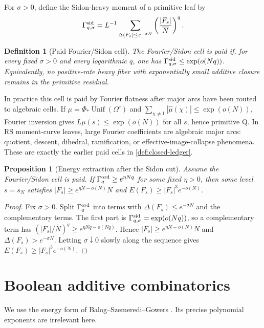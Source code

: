 \documentclass[11pt,a4paper]{amsart}
\numberwithin{equation}{section}
\newtheorem{proposition}[theorem]{Proposition}
\newtheorem{definition}[theorem]{Definition}
\theoremstyle{remark}
\newcommand{\OmegaC}{\Omega^{\circ}}
\newcommand{\Gord}{\Gamma^{\rm ord}}
\newcommand{\Gsid}{\Gamma^{\rm sid}}
\newcommand{\barN}{\overline N}
\begin{document}
For \(\sigma>0\), define the Sidon-heavy moment of a primitive leaf by
\[
        \Gsid_{q,\sigma}
        =L^{-1}\sum_{\Delta(F_s)\le e^{-\sigma N}}
        \left(\frac{|F_s|}{\barN}\right)^q .
\]

\begin{definition}[Paid Fourier/Sidon cell]\label{def:sidon-paid}
The Fourier/Sidon cell is paid if, for every fixed \(\sigma>0\) and every logarithmic \(q\), one has \(\Gsid_{q,\sigma}\le\exp(o(Nq))\).  Equivalently, no positive-rate heavy fiber with exponentially small additive closure remains in the primitive residual.
\end{definition}

In practice this cell is paid by Fourier flatness after major arcs have been routed to algebraic cells.  If \(\mu=\Phi_*\operatorname{Unif}(\OmegaC)\) and \(\sum_{\chi\ne1}|\widehat\mu(\chi)|\le\exp(o(N))\), Fourier inversion gives \(L\mu(s)\le\exp(o(N))\) for all \(s\), hence primitive Q.  In RS moment-curve leaves, large Fourier coefficients are algebraic major arcs: quotient, descent, dihedral, ramification, or effective-image-collapse phenomena.  These are exactly the earlier paid cells in \cref{def:closed-ledger}.

\begin{proposition}[Energy extraction after the Sidon cut]\label{prop:energy-extract}
Assume the Fourier/Sidon cell is paid.  If \(\Gord_q\ge e^{\eta Nq}\) for some fixed \(\eta>0\), then some level \(s=s_N\) satisfies \(|F_s|\ge e^{\eta N-o(N)}\barN\) and \(E(F_s)\ge |F_s|^3e^{-o(N)}\).
\end{proposition}

\begin{proof}
Fix \(\sigma>0\).  Split \(\Gord_q\) into terms with \(\Delta(F_s)\le e^{-\sigma N}\) and the complementary terms.  The first part is \(\Gsid_{q,\sigma}=\exp(o(Nq))\), so a complementary term has \((|F_s|/\barN)^q\ge e^{\eta Nq-o(Nq)}\).  Hence \(|F_s|\ge e^{\eta N-o(N)}\barN\) and \(\Delta(F_s)>e^{-\sigma N}\).  Letting \(\sigma\downarrow0\) slowly along the sequence gives \(E(F_s)\ge |F_s|^3e^{-o(N)}\).
\end{proof}

\section{Boolean additive combinatorics}\label{sec:bsg}

We use the energy form of Balog--Szemeredi--Gowers \cite{BalogSzemeredi,Gowers1998}.  Its precise polynomial exponents are irrelevant here.
\end{document}
